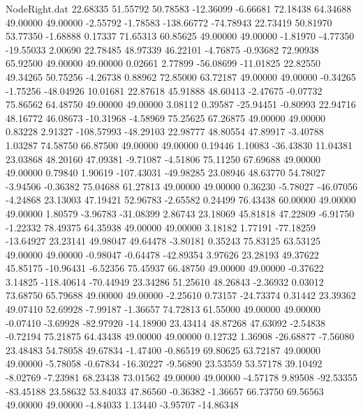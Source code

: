 \begin{filecontents}{NodeRight.dat}
  22.68335   51.55792   50.78583   -12.36099   -6.66681   72.18438   64.34688   49.00000   49.00000   -2.55792   -1.78583 -138.66772  -74.78943
  22.73419   50.81970   53.77350    -1.68888    0.17337   71.65313   60.85625   49.00000   49.00000   -1.81970   -4.77350  -19.55033    2.00690
  22.78485   48.97339   46.22101    -4.76875   -0.93682   72.90938   65.92500   49.00000   49.00000    0.02661    2.77899  -56.08699  -11.01825
  22.82550   49.34265   50.75256    -4.26738    0.88962   72.85000   63.72187   49.00000   49.00000   -0.34265   -1.75256  -48.04926   10.01681
  22.87618   45.91888   48.60413    -2.47675   -0.07732   75.86562   64.48750   49.00000   49.00000    3.08112    0.39587  -25.94451   -0.80993
  22.94716   48.16772   46.08673   -10.31968   -4.58969   75.25625   67.26875   49.00000   49.00000    0.83228    2.91327 -108.57993  -48.29103
  22.98777   48.80554   47.89917    -3.40788    1.03287   74.58750   66.87500   49.00000   49.00000    0.19446    1.10083  -36.43830   11.04381
  23.03868   48.20160   47.09381    -9.71087   -4.51806   75.11250   67.69688   49.00000   49.00000    0.79840    1.90619 -107.43031  -49.98285
  23.08946   48.63770   54.78027    -3.94506   -0.36382   75.04688   61.27813   49.00000   49.00000    0.36230   -5.78027  -46.07056   -4.24868
  23.13003   47.19421   52.96783    -2.65582    0.24499   76.43438   60.00000   49.00000   49.00000    1.80579   -3.96783  -31.08399    2.86743
  23.18069   45.81818   47.22809    -6.91750   -1.22332   78.49375   64.35938   49.00000   49.00000    3.18182    1.77191  -77.18259  -13.64927
  23.23141   49.98047   49.64478    -3.80181    0.35243   75.83125   63.53125   49.00000   49.00000   -0.98047   -0.64478  -42.89354    3.97626
  23.28193   49.37622   45.85175   -10.96431   -6.52356   75.45937   66.48750   49.00000   49.00000   -0.37622    3.14825 -118.40614  -70.44949
  23.34286   51.25610   48.26843    -2.36932    0.03012   73.68750   65.79688   49.00000   49.00000   -2.25610    0.73157  -24.73374    0.31442
  23.39362   49.07410   52.69928    -7.99187   -1.36657   74.72813   61.55000   49.00000   49.00000   -0.07410   -3.69928  -82.97920  -14.18900
  23.43414   48.87268   47.63092    -2.54838   -0.72194   75.21875   64.43438   49.00000   49.00000    0.12732    1.36908  -26.68877   -7.56080
  23.48483   54.78058   49.67834    -1.47400   -0.86519   69.80625   63.72187   49.00000   49.00000   -5.78058   -0.67834  -16.30227   -9.56890
  23.53559   53.57178   39.10492    -8.02769   -7.23981   68.23438   73.01562   49.00000   49.00000   -4.57178    9.89508  -92.53355  -83.45188
  23.58632   53.84033   47.86560    -0.36382   -1.36657   66.73750   69.56563   49.00000   49.00000   -4.84033    1.13440   -3.95707  -14.86348

\end{filecontents}
